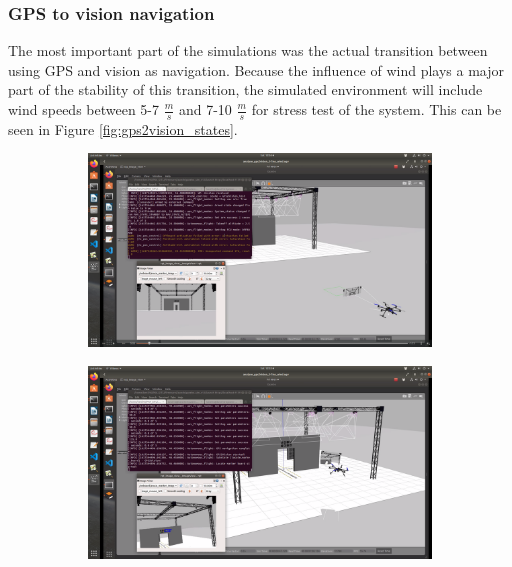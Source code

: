 \documentclass[../Head/report.tex]{subfiles}
\begin{document}
\subsubsection{GPS to vision navigation}
\label{sec:gps2vision_transition}

The most important part of the simulations was the actual transition between using GPS and vision as navigation. Because the influence of wind plays a major part of the stability of this transition, the simulated environment will include wind speeds between 5-7 $\frac{m}{s}$ and 7-10 $\frac{m}{s}$ for stress test of the system. This can be seen in Figure \ref{fig:gps2vision_states}. 

\begin{figure}[H]
    \centering
    \begin{subfigure}[t]{.30\textwidth}
        \centering
        \includegraphics[width=\textwidth]{../Figures/GPS2Vision/drone_start_pose_gps.png}
        \caption{}
        \label{fig:gps2vision_gps}
    \end{subfigure}
     \hspace{0.2em}
    \begin{subfigure}[t]{.30\textwidth}
        \centering
        \includegraphics[width=\textwidth]{../Figures/GPS2Vision/drone_locate_board.png}

\end{subfigure}
\end{figure}
\end{document}
